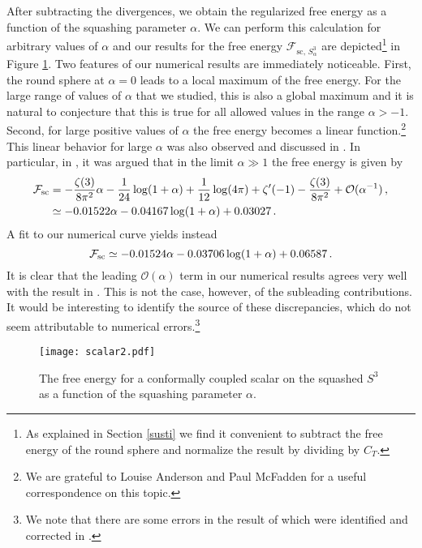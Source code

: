 \documentclass[12pt]{article}
\numberwithin{equation}{section}
\newcommand{\ssc}{\scriptscriptstyle}
\newcommand{\ctt}{C_{\ssc T}}
\begin{document}
After subtracting the divergences, we obtain the regularized free energy as a function of the squashing parameter $\alpha$.  We can perform this calculation for arbitrary values of $\alpha$ and our results for the free energy $\mathcal{F}_{\textrm{sc},\,  S^3_{\alpha}}$ are depicted\footnote{As explained in Section \ref{susti} we find it convenient to subtract the free energy of the round sphere and normalize the result by dividing by $\ctt$.} in Figure \ref{fig:3dscalar}. Two features of our numerical results are immediately noticeable. First, the round sphere at $\alpha=0$ leads to a local maximum of the free energy. For the large range of values of $\alpha$ that we studied, this is also a global maximum and it is natural to conjecture that this is true for all allowed values in the range $\alpha>-1$. Second, for large positive values of $\alpha$ the free energy becomes a linear function.\footnote{We are grateful to Louise Anderson and Paul McFadden for a useful correspondence on this topic.} This linear behavior for large $\alpha$ was also observed and discussed in  \cite{DeFrancia:2000xm,Hartnoll:2005yc}. In particular, in \cite{DeFrancia:2000xm}, it was argued that in the limit $\alpha \gg 1$ the free energy is given by
%
\begin{align}
	\mathcal{F}_{\rm{sc}}&= -\frac{\zeta(3)}{8\pi^2} \alpha -\frac{1}{24}\log(1+\alpha)+\frac{1}{12}\log(4\pi)+\zeta'(-1)-\frac{\zeta(3)}{8\pi^2}+\mathcal{O}(\alpha^{-1})\, ,\\ 
	\notag
		&\simeq-0.01522\alpha-0.04167 \log(1+\alpha)+ 0.03027\, .
\end{align}
%	
A fit to our numerical curve yields instead
%
\begin{equation}
	 \mathcal{F}_{\rm{sc}}\simeq -0.01524\alpha-0.03706\log(1+\alpha)+0.06587\, .
\end{equation}
%
It is clear that the leading $\mathcal{O}(\alpha)$ term in our numerical results agrees very well with the result in \cite{DeFrancia:2000xm}. This is not the case, however, of the subleading contributions. It would be interesting to identify the source of these discrepancies, which do not seem attributable to numerical errors.\footnote{We note that there are some errors in the result of \cite{Dowker:1998pi} which were identified and corrected in \cite{DeFrancia:2000xm}.}
	 





\begin{figure}[ht!]
	\centering
	\texttt{[image: scalar2.pdf]}
	\caption{The free energy for a conformally coupled scalar on the squashed $S^3$ as a function of the squashing parameter $\alpha$.}\label{fig:3dscalar}
\end{figure}
\end{document}

